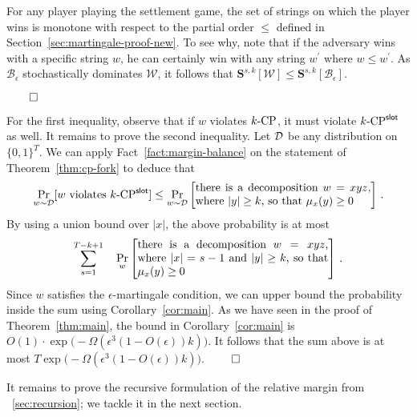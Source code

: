 For any player playing the settlement game, 
the set of strings on which the player wins is monotone 
with respect to the partial order $\leq$ defined in Section~\ref{sec:martingale-proof-new}. 
To see why, note that if the adversary wins with a specific string $w$, 
he can certainly win with any string $w^\prime$ where $w \leq w^\prime$. 
As $\mathcal{B}_\epsilon$ stochastically dominates $\mathcal{W}$, it follows that 
$
  \mathbf{S}^{s,k}[\mathcal{W}] \leq \mathbf{S}^{s,k}[\mathcal{B}_\epsilon]
$.

\hfill$\qed$


For the first inequality, observe that if $w$ violates ${k}\text{-}\mathrm{CP}$, it must violate ${k}\text{-}\mathrm{CP}^{\mathsf{slot}}$ as well. 
It remains to prove the second inequality. 
Let $\mathcal{D}$ be any distribution on $\{0,1\}^T$. 
We can apply Fact~\ref{fact:margin-balance} on the statement of Theorem~\ref{thm:cp-fork} 
to deduce that 
\begin{equation*}\label{eq:main-argument-1}
  \Pr_{w \sim \Distribution}[\text{$w$ violates $\kSlotCP$}] 
    \leq 
    \Pr_{w \sim \Distribution}\left[\parbox{55mm}{
      there is a decomposition $w = xyz$, 
      where $|y| \geq k$, 
      so that $\mu_x(y) \geq 0$ 
    } \right] 
    \,.
\end{equation*}
By using a union bound over $|x|$, the above probability is at most 
\[
    \sum_{s = 1}^{T - k + 1} 
    \quad 
      \Pr_w\left[\parbox{60mm}{
        there is a decomposition $w = xyz$, 
        where $|x| = s - 1$ and $|y| \geq k$, 
        so that $\mu_x(y) \geq 0$ 
      }\right] 
    \,.
\]
Since $w$ satisfies the $\epsilon$-martingale condition, 
we can upper bound the probability inside the sum 
using Corollary~\ref{cor:main}. 
As we have seen in the proof of Theorem~\ref{thm:main}, 
the bound in Corollary~\ref{cor:main} is 
$
  O(1) \cdot \exp\bigl(-\Omega(\epsilon^3 (1 - O(\epsilon))k)\bigr)
$.
It follows that the sum above is at most $T \exp\bigl(-\Omega(\epsilon^3 (1 - O(\epsilon))k)\bigr)$.
\hfill $\qed$


It remains to prove the recursive formulation of the relative margin 
from \Section~\ref{sec:recursion}; 
we tackle it in the next section.



